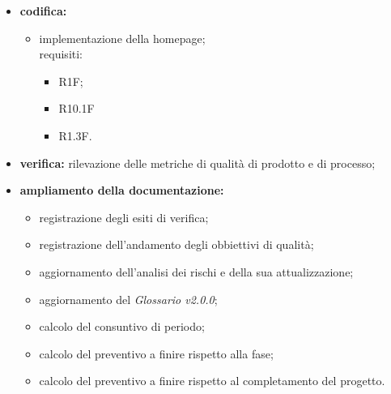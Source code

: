 \begin{itemize}
    \item \textbf{codifica:}
          \begin{itemize}
              \item implementazione della homepage;\\ requisiti:
                    \begin{itemize}
                        \item R1F;                                                                   \item R10.1F
                        \item R1.3F.
                    \end{itemize}
          \end{itemize}
    \item \textbf{verifica:} rilevazione delle metriche di qualità di prodotto e di processo;
    \item \textbf{ampliamento della documentazione:}
          \begin{itemize}
              \item registrazione degli esiti di verifica;
              \item registrazione dell'andamento degli obbiettivi di qualità;
              \item aggiornamento dell'analisi dei rischi e della sua attualizzazione;
              \item aggiornamento del \textit{Glossario v2.0.0};
              \item calcolo del consuntivo di periodo;
              \item calcolo del preventivo a finire rispetto alla fase;
              \item calcolo del preventivo a finire rispetto al completamento del progetto.
          \end{itemize}
\end{itemize}

